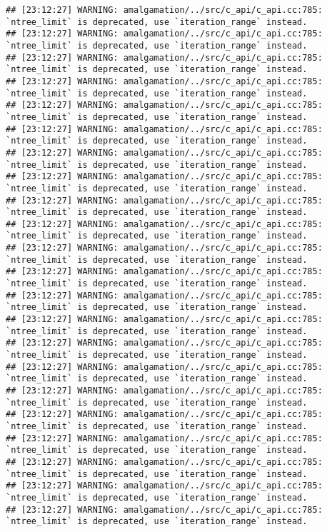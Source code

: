 \documentclass[
]{article}
\begin{document}
\begin{verbatim}
## [23:12:27] WARNING: amalgamation/../src/c_api/c_api.cc:785: `ntree_limit` is deprecated, use `iteration_range` instead.
## [23:12:27] WARNING: amalgamation/../src/c_api/c_api.cc:785: `ntree_limit` is deprecated, use `iteration_range` instead.
## [23:12:27] WARNING: amalgamation/../src/c_api/c_api.cc:785: `ntree_limit` is deprecated, use `iteration_range` instead.
## [23:12:27] WARNING: amalgamation/../src/c_api/c_api.cc:785: `ntree_limit` is deprecated, use `iteration_range` instead.
## [23:12:27] WARNING: amalgamation/../src/c_api/c_api.cc:785: `ntree_limit` is deprecated, use `iteration_range` instead.
## [23:12:27] WARNING: amalgamation/../src/c_api/c_api.cc:785: `ntree_limit` is deprecated, use `iteration_range` instead.
## [23:12:27] WARNING: amalgamation/../src/c_api/c_api.cc:785: `ntree_limit` is deprecated, use `iteration_range` instead.
## [23:12:27] WARNING: amalgamation/../src/c_api/c_api.cc:785: `ntree_limit` is deprecated, use `iteration_range` instead.
## [23:12:27] WARNING: amalgamation/../src/c_api/c_api.cc:785: `ntree_limit` is deprecated, use `iteration_range` instead.
## [23:12:27] WARNING: amalgamation/../src/c_api/c_api.cc:785: `ntree_limit` is deprecated, use `iteration_range` instead.
## [23:12:27] WARNING: amalgamation/../src/c_api/c_api.cc:785: `ntree_limit` is deprecated, use `iteration_range` instead.
## [23:12:27] WARNING: amalgamation/../src/c_api/c_api.cc:785: `ntree_limit` is deprecated, use `iteration_range` instead.
## [23:12:27] WARNING: amalgamation/../src/c_api/c_api.cc:785: `ntree_limit` is deprecated, use `iteration_range` instead.
## [23:12:27] WARNING: amalgamation/../src/c_api/c_api.cc:785: `ntree_limit` is deprecated, use `iteration_range` instead.
## [23:12:27] WARNING: amalgamation/../src/c_api/c_api.cc:785: `ntree_limit` is deprecated, use `iteration_range` instead.
## [23:12:27] WARNING: amalgamation/../src/c_api/c_api.cc:785: `ntree_limit` is deprecated, use `iteration_range` instead.
## [23:12:27] WARNING: amalgamation/../src/c_api/c_api.cc:785: `ntree_limit` is deprecated, use `iteration_range` instead.
## [23:12:27] WARNING: amalgamation/../src/c_api/c_api.cc:785: `ntree_limit` is deprecated, use `iteration_range` instead.
## [23:12:27] WARNING: amalgamation/../src/c_api/c_api.cc:785: `ntree_limit` is deprecated, use `iteration_range` instead.
## [23:12:27] WARNING: amalgamation/../src/c_api/c_api.cc:785: `ntree_limit` is deprecated, use `iteration_range` instead.
## [23:12:27] WARNING: amalgamation/../src/c_api/c_api.cc:785: `ntree_limit` is deprecated, use `iteration_range` instead.
## [23:12:27] WARNING: amalgamation/../src/c_api/c_api.cc:785: `ntree_limit` is deprecated, use `iteration_range` instead.

\end{verbatim}
\end{document}
